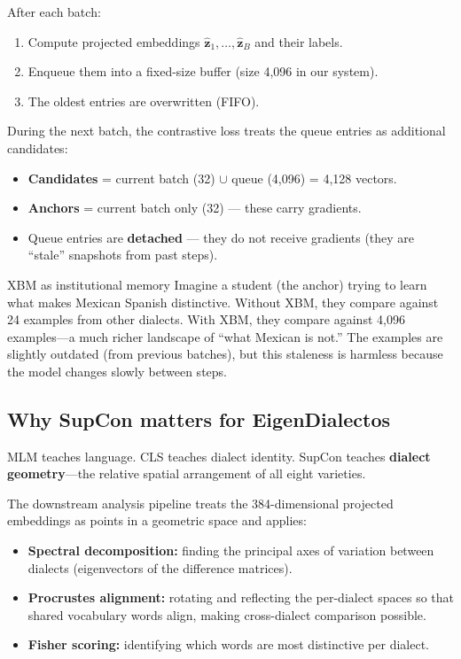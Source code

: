 \documentclass[11pt,a4paper]{article}
\theoremstyle{definition}
\begin{document}
\begin{mathbox}
After each batch:
\begin{enumerate}[nosep]
  \item Compute projected embeddings $\hat{\mathbf{z}}_1, \ldots,
        \hat{\mathbf{z}}_B$ and their labels.
  \item Enqueue them into a fixed-size buffer (size 4,096 in our
        system).
  \item The oldest entries are overwritten (FIFO).
\end{enumerate}
During the next batch, the contrastive loss treats the queue entries
as additional candidates:
\begin{itemize}[nosep]
  \item \textbf{Candidates} = current batch (32) $\cup$ queue (4,096)
        = 4,128 vectors.
  \item \textbf{Anchors} = current batch only (32) --- these carry
        gradients.
  \item Queue entries are \textbf{detached} --- they do not receive
        gradients (they are ``stale'' snapshots from past steps).
\end{itemize}
\end{mathbox}

\begin{intuition}{XBM as institutional memory}
Imagine a student (the anchor) trying to learn what makes Mexican
Spanish distinctive. Without XBM, they compare against 24 examples
from other dialects. With XBM, they compare against 4,096 examples---a
much richer landscape of ``what Mexican is not.'' The examples are
slightly outdated (from previous batches), but this staleness is
harmless because the model changes slowly between steps.
\end{intuition}

\subsection{Why SupCon matters for EigenDialectos}

MLM teaches language. CLS teaches dialect identity. SupCon teaches
\textbf{dialect geometry}---the relative spatial arrangement of all
eight varieties.

The downstream analysis pipeline treats the 384-dimensional projected
embeddings as points in a geometric space and applies:
\begin{itemize}[nosep]
  \item \textbf{Spectral decomposition:} finding the principal axes of
        variation between dialects (eigenvectors of the difference
        matrices).
  \item \textbf{Procrustes alignment:} rotating and reflecting the
        per-dialect spaces so that shared vocabulary words align,
        making cross-dialect comparison possible.
  \item \textbf{Fisher scoring:} identifying which words are most
        distinctive per dialect.
\end{itemize}
\end{document}
